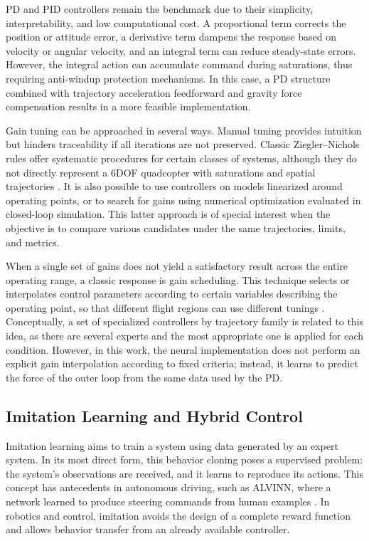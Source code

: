 PD and PID controllers remain the benchmark due to their simplicity, interpretability, and low computational cost. A proportional term corrects the position or attitude error, a derivative term dampens the response based on velocity or angular velocity, and an integral term can reduce steady-state errors. However, the integral action can accumulate command during saturations, thus requiring anti-windup protection mechanisms. In this case, a PD structure combined with trajectory acceleration feedforward and gravity force compensation results in a more feasible implementation.

Gain tuning can be approached in several ways. Manual tuning provides intuition but hinders traceability if all iterations are not preserved. Classic Ziegler--Nichols rules offer systematic procedures for certain classes of systems, although they do not directly represent a 6DOF quadcopter with saturations and spatial trajectories \cite{ziegler1942optimum}. It is also possible to use controllers on models linearized around operating points, or to search for gains using numerical optimization evaluated in closed-loop simulation. This latter approach is of special interest when the objective is to compare various candidates under the same trajectories, limits, and metrics.

When a single set of gains does not yield a satisfactory result across the entire operating range, a classic response is gain scheduling. This technique selects or interpolates control parameters according to certain variables describing the operating point, so that different flight regions can use different tunings \cite{leith2000survey}. Conceptually, a set of specialized controllers by trajectory family is related to this idea, as there are several experts and the most appropriate one is applied for each condition. However, in this work, the neural implementation does not perform an explicit gain interpolation according to fixed criteria; instead, it learns to predict the force of the outer loop from the same data used by the PD.

\subsection{Imitation Learning and Hybrid Control}

Imitation learning aims to train a system using data generated by an expert system. In its most direct form, this behavior cloning poses a supervised problem: the system's observations are received, and it learns to reproduce its actions. This concept has antecedents in autonomous driving, such as ALVINN, where a network learned to produce steering commands from human examples \cite{pomerleau1989alvinn}. In robotics and control, imitation avoids the design of a complete reward function and allows behavior transfer from an already available controller.

